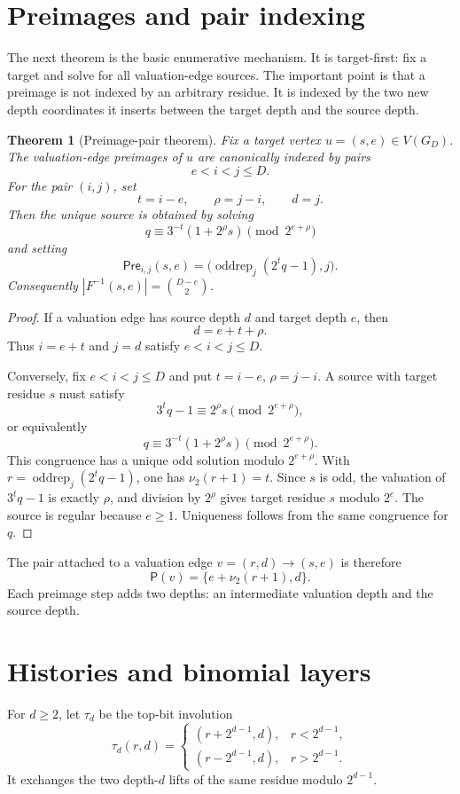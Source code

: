 \documentclass[11pt]{amsart}
\newtheorem{theorem}{Theorem}[section]
\theoremstyle{definition}
\theoremstyle{remark}
\newcommand{\nuu}{\nu_2}
\newcommand{\oddrep}{\operatorname{oddrep}}
\newcommand{\Pre}{\mathsf{Pre}}
\newcommand{\Pair}{\mathsf P}
\begin{document}
\section{Preimages and pair indexing}\label{sec:preimages}

The next theorem is the basic enumerative mechanism.  It is target-first: fix a target and solve for all valuation-edge sources.  The important point is that a preimage is not indexed by an arbitrary residue.  It is indexed by the two new depth coordinates it inserts between the target depth and the source depth.

\begin{theorem}[Preimage-pair theorem]\label{thm:preimage}
Fix a target vertex $u=(s,e)\in V(G_D)$.  The valuation-edge preimages of $u$ are canonically indexed by pairs
\[
e<i<j\le D.
\]
For the pair $(i,j)$, set
\[
t=i-e,
\qquad
\rho=j-i,
\qquad
 d=j.
\]
Then the unique source is obtained by solving
\[
q\equiv3^{-t}(1+2^\rho s)\pmod {2^{e+\rho}}
\]
and setting
\[
\Pre_{i,j}(s,e)=\bigl(\oddrep_j(2^tq-1),j\bigr).
\]
Consequently $|F^{-1}(s,e)|=\binom{D-e}{2}$.
\end{theorem}

\begin{proof}
If a valuation edge has source depth $d$ and target depth $e$, then
\[
d=e+t+\rho.
\]
Thus $i=e+t$ and $j=d$ satisfy $e<i<j\le D$.

Conversely, fix $e<i<j\le D$ and put $t=i-e$, $\rho=j-i$.  A source with target residue $s$ must satisfy
\[
3^tq-1\equiv2^\rho s\pmod {2^{e+\rho}},
\]
or equivalently
\[
q\equiv3^{-t}(1+2^\rho s)\pmod {2^{e+\rho}}.
\]
This congruence has a unique odd solution modulo $2^{e+\rho}$.  With $r=\oddrep_j(2^tq-1)$, one has $\nuu(r+1)=t$.  Since $s$ is odd, the valuation of $3^tq-1$ is exactly $\rho$, and division by $2^\rho$ gives target residue $s$ modulo $2^e$.  The source is regular because $e\ge1$.  Uniqueness follows from the same congruence for $q$.
\end{proof}

The pair attached to a valuation edge $v=(r,d)\to(s,e)$ is therefore
\[
\Pair(v)=\{e+\nuu(r+1),d\}.
\]
Each preimage step adds two depths: an intermediate valuation depth and the source depth.

\section{Histories and binomial layers}\label{sec:histories}

For $d\ge2$, let $\tau_d$ be the top-bit involution
\[
\tau_d(r,d)=
\begin{cases}
(r+2^{d-1},d),&r<2^{d-1},\\
(r-2^{d-1},d),&r>2^{d-1}.
\end{cases}
\]
It exchanges the two depth-$d$ lifts of the same residue modulo $2^{d-1}$.
\end{document}
